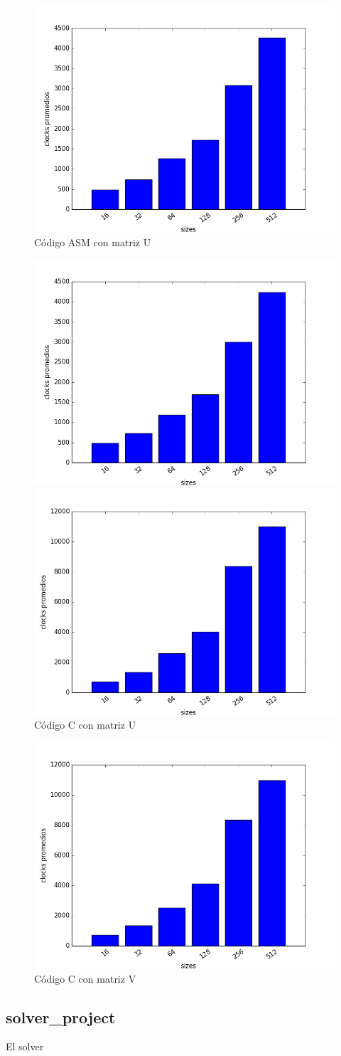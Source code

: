 \begin{figure}[h]
  \centering
  	\includegraphics[width=.6\linewidth]{ClocksASMU.png}
  	\caption{Código ASM con matriz U}
  	\label{fig:ASMU}
\end{figure}

\pagebreak

\begin{figure}[h]
  \centering
  	\includegraphics[width=.6\linewidth]{ClocksASMV.png}
  	\caption{Código ASM con matriz V}
  	\label{fig:ASMV}
  \centering
  	\includegraphics[width=.6\linewidth]{ClocksCU.png}
  	\caption{Código C con matriz U}
  	\label{fig:CU}
\end{figure}

\begin{figure}[h]
  \centering
  	\includegraphics[width=.6\linewidth]{ClocksCV.png}
  	\caption{Código C con matriz V}
  	\label{fig:CV}
\end{figure}

\pagebreak

\subsection{solver\_project}

El solver 
